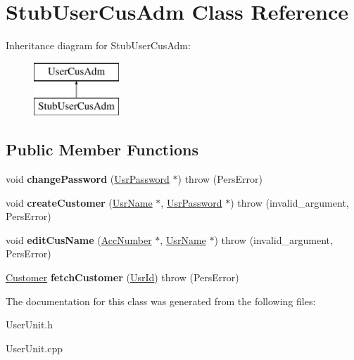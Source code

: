 \hypertarget{classStubUserCusAdm}{\section{Stub\-User\-Cus\-Adm Class Reference}
\label{d1/d9d/classStubUserCusAdm}
}
Inheritance diagram for Stub\-User\-Cus\-Adm\-:\begin{figure}[H]
\begin{center}
\leavevmode
\includegraphics[height=2.000000cm]{d1/d9d/classStubUserCusAdm}
\end{center}
\end{figure}
\subsection*{Public Member Functions}
\begin{DoxyCompactItemize}
\item 
\hypertarget{classStubUserCusAdm_a7e44bec3dc4fb0640e6eb418dd8e8320}{void {\bfseries change\-Password} (\hyperlink{classUsrPassword}{Usr\-Password} $\ast$)  throw (\-Pers\-Error)}\label{d1/d9d/classStubUserCusAdm_a7e44bec3dc4fb0640e6eb418dd8e8320}

\item 
\hypertarget{classStubUserCusAdm_a53dc0deb3cf26a09c2814504b0daab63}{void {\bfseries create\-Customer} (\hyperlink{classUsrName}{Usr\-Name} $\ast$, \hyperlink{classUsrPassword}{Usr\-Password} $\ast$)  throw (invalid\-\_\-argument, Pers\-Error)}\label{d1/d9d/classStubUserCusAdm_a53dc0deb3cf26a09c2814504b0daab63}

\item 
\hypertarget{classStubUserCusAdm_a84ca3047ccb0ac2e371a23c4e4fcdba0}{void {\bfseries edit\-Cus\-Name} (\hyperlink{classAccNumber}{Acc\-Number} $\ast$, \hyperlink{classUsrName}{Usr\-Name} $\ast$)  throw (invalid\-\_\-argument, Pers\-Error)}\label{d1/d9d/classStubUserCusAdm_a84ca3047ccb0ac2e371a23c4e4fcdba0}

\item 
\hypertarget{classStubUserCusAdm_aac14b018a6284211b1c83c48a9529efe}{\hyperlink{classCustomer}{Customer} {\bfseries fetch\-Customer} (\hyperlink{classUsrId}{Usr\-Id})  throw (\-Pers\-Error)}\label{d1/d9d/classStubUserCusAdm_aac14b018a6284211b1c83c48a9529efe}

\end{DoxyCompactItemize}


The documentation for this class was generated from the following files\-:\begin{DoxyCompactItemize}
\item 
User\-Unit.\-h\item 
User\-Unit.\-cpp\end{DoxyCompactItemize}
